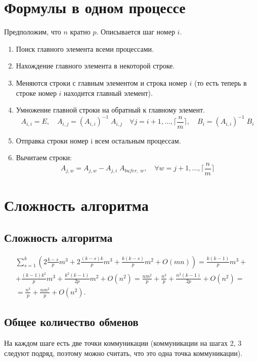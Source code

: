 \documentclass[12pt]{article} %
\begin{document}
\section{Формулы в одном процессе}
Предположим, что $n$ кратно $p$. Описывается шаг номер $i$.
\begin{enumerate}
    \item Поиск главного элемента всеми процессами.
    \item Нахождение главного элемента в некоторой строке.
    \item Меняются строки с главным элементом и строка номер $i$ (то есть теперь в строке номер $i$ находится главный элемент).
    \item Умножение главной строки на обратный к главному элемент.
    $$ A_{i,i} = E, \quad A_{i,j} = (A_{i,i})^{-1} \; A_{i,j} \quad \forall j = i+1, \ldots, \lceil \frac{n}{m} \rceil, \quad B_i = (A_{i,i})^{-1} \; B_i$$
    \item Отправка строки номер i всем остальным процессам.
    \item Вычитаем строки:
    $$ A_{j,w} = A_{j,w} - A_{j,i} \; A_{bufer, \; w}, \quad \forall w = j+1, \ldots, \lceil \frac{n}{m} \rceil $$
    
\end{enumerate}

\section{Сложность алгоритма}
\subsection{Сложность алгоритма}
\begin{multline} \nonumber
    \sum_{s = 1}^{k} \left( 2\frac{k-s}{p}m^3 + 2\frac{(k-s)k}{p}m^3 + \frac{k(k-s)}{p}m^2 + O(mn) \right) = 
    \frac{k(k-1)}{p}m^3 + \\ + \frac{(k-1)k^2}{p}m^3 + \frac{k^2(k-1)}{2p}m^2 + O(n^2) = \frac{nm^2}p + \frac{n^3}{p} + \frac{n^2(k-1)}{2p} + O(n^2) = \\ = \frac{n^3}{p} + \frac{nm^2}{p} + O(n^2).
\end{multline}

\subsection{Общее количество обменов}
На каждом шаге есть две точки коммуникации (коммуникации на шагах 2, 3 следуют подряд, поэтому можно считать, что это одна точка коммуникации).
\end{document}
